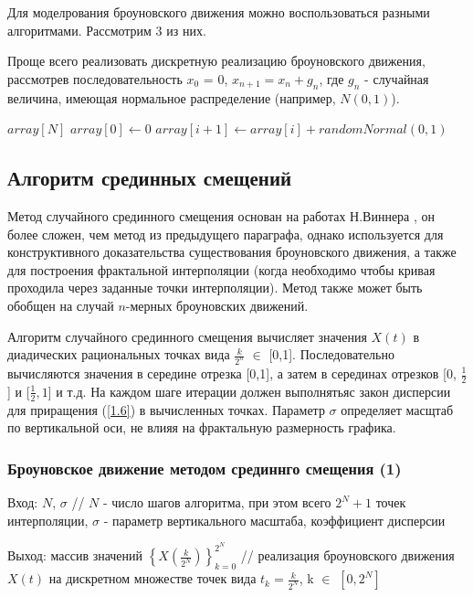 Для моделрования броуновского движения можно воспользоваться разными алгоритмами. Рассмотрим 3 из них.

Проще всего реализовать дискретную реализацию броуновского движения, рассмотрев последовательность $x_0$ = 0, $x_{n+1} = x_n + g_n$, где $g_n$ - случайная величина, имеющая нормальное распределение (например, $N(0,1)$).

\begin{algorithmic}[1]
	\State $array[N]$
	\State $array[0]\gets 0$
	\State $array[i+1]\gets array[i] + randomNormal(0,1)$
	\EndFor
\end{algorithmic}

\subsection{Алгоритм срединных смещений}

Метод случайного срединного смещения основан на работах Н.Виннера , он более сложен, чем метод из предыдущего параграфа, однако используется для конструктивного доказательства существования броуновского движения, а также для построения фрактальной интерполяции (когда необходимо чтобы кривая проходила через заданные точки интерполяции). Метод также может быть обобщен на случай $n$-мерных броуновских движений.

Алгоритм случайного срединного смещения вычисляет значения $X(t)$ в диадических рациональных точках вида $\frac{k}{2^n}$ $\in$ [0,1]. Последовательно вычисляются значения в середине отрезка [0,1], а затем в серединах отрезков [0, $\frac{1}{2}$] и [$\frac{1}{2}, 1$] и т.д. На каждом шаге итерации должен выполнятьяс закон дисперсии для приращения (\ref{1.6}) в вычисленных точках. Параметр $\sigma$ определяет масщтаб по вертикальной оси, не влияя на фрактальную размерность графика. 

\subsubsection{Броуновское движение методом срединнго смещения (1)}
Вход: $N$, 	$\sigma$ // $N$ - число шагов алгоритма, при этом всего $2^N + 1$ точек интерполяции, $\sigma$ - параметр вертикального масштаба, коэффициент дисперсии

Выход: массив значений $\left\{X(\frac{k}{2^N})\right\}_{k=0}^{2^N}$ // реализация броуновского движения $X(t)$ на дискретном множестве точек вида $t_k = \frac{k}{2^N}$, k $\in$ $[0, 2^N]$

